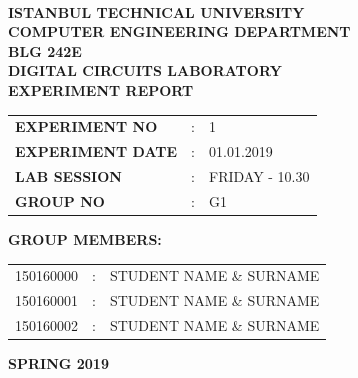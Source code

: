 \documentclass[pdftex,12pt,a4paper]{article}
\begin{document}
\begin{titlepage}
\begin{center}
\textbf{}\\
\textbf{\Large{ISTANBUL TECHNICAL UNIVERSITY}}\\
\vspace{0.5cm}
\textbf{\Large{COMPUTER ENGINEERING DEPARTMENT}}\\
\vspace{2cm}
\textbf{\Large{BLG 242E\\ DIGITAL CIRCUITS LABORATORY\\ EXPERIMENT REPORT}}\\
\vspace{2.8cm}
\begin{table}[ht]
\centering
\Large{
\begin{tabular}{lcl}
\textbf{EXPERIMENT NO}  & : & 1 \\
\textbf{EXPERIMENT DATE}  & : & 01.01.2019 \\
\textbf{LAB SESSION}  & : & FRIDAY - 10.30 \\
\textbf{GROUP NO}  & : & G1 \\
\end{tabular}}
\end{table}
\vspace{1cm}
\textbf{\Large{GROUP MEMBERS:}}\\
\begin{table}[ht]
\centering
\Large{
\begin{tabular}{rcl}
150160000  & : & STUDENT NAME \& SURNAME \\
150160001  & : & STUDENT NAME \& SURNAME \\
150160002  & : & STUDENT NAME \& SURNAME \\
\end{tabular}}
\end{table}
\vspace{2.8cm}
\textbf{\Large{SPRING 2019}}

\end{center}

\end{titlepage}

\newpage
\newpage

\thispagestyle{empty}
\setcounter{tocdepth}{4}
\tableofcontents
\clearpage
\end{document}
